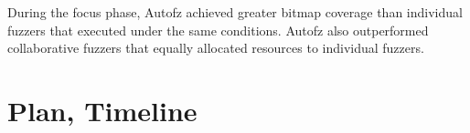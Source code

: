 During the focus phase, Autofz achieved greater bitmap coverage than individual fuzzers that executed under the same conditions. Autofz also outperformed collaborative fuzzers that equally allocated resources to individual fuzzers. \cite{Fu}

\section{Plan, Timeline}






